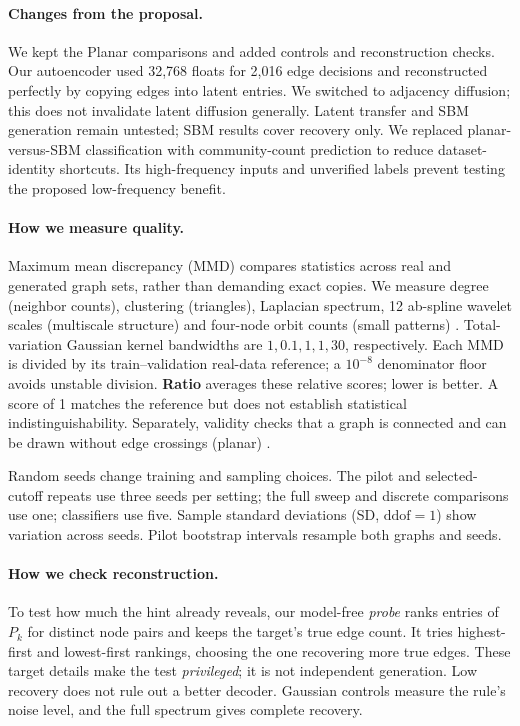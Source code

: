 \documentclass[11pt]{article}
\begin{document}
\paragraph{Changes from the proposal.} We kept the Planar comparisons and added controls and
reconstruction checks. Our autoencoder used 32,768 floats for 2,016 edge decisions and
reconstructed perfectly by copying edges into latent entries. We switched to adjacency
diffusion; this does not invalidate latent diffusion generally. Latent transfer and SBM
generation remain untested; SBM results cover recovery only. We replaced planar-versus-SBM
classification with community-count prediction to reduce dataset-identity shortcuts. Its
high-frequency inputs and unverified labels prevent testing the proposed low-frequency benefit.

\paragraph{How we measure quality.} Maximum mean discrepancy (MMD) \citep{gretton2012mmd}
compares statistics across real and generated graph sets, rather than demanding exact copies.
We measure degree (neighbor counts), clustering (triangles), Laplacian spectrum,
12 ab-spline wavelet scales (multiscale structure) and four-node orbit counts (small patterns)
\citep{you2018graphrnn,liao2019gran,hocevar2014orca}. Total-variation Gaussian kernel
bandwidths are $1,0.1,1,1,30$, respectively. Each MMD is divided by its train--validation
real-data reference; a $10^{-8}$ denominator floor avoids unstable division.
\textbf{Ratio} averages these relative scores; lower is better. A score of 1 matches the
reference but does not establish statistical indistinguishability. Separately, validity checks that a graph is
connected and can be drawn without edge crossings (planar) \citep{hagberg2008networkx}.

Random seeds change training and sampling choices. The pilot and selected-cutoff repeats
use three seeds per setting; the full sweep and discrete comparisons use one;
classifiers use five. Sample standard deviations (SD, $\mathrm{ddof}=1$) show variation across
seeds. Pilot bootstrap intervals resample both graphs and seeds.

\paragraph{How we check reconstruction.} To test how much the hint already reveals, our
model-free \emph{probe} ranks entries of $P_k$ for distinct node pairs and keeps the target's
true edge count. It tries highest-first and lowest-first rankings, choosing the one recovering
more true edges. These target details make the test \emph{privileged}; it is not independent
generation. Low recovery does not rule out a better decoder. Gaussian controls measure the
rule's noise level, and the full spectrum gives complete recovery.
\end{document}
